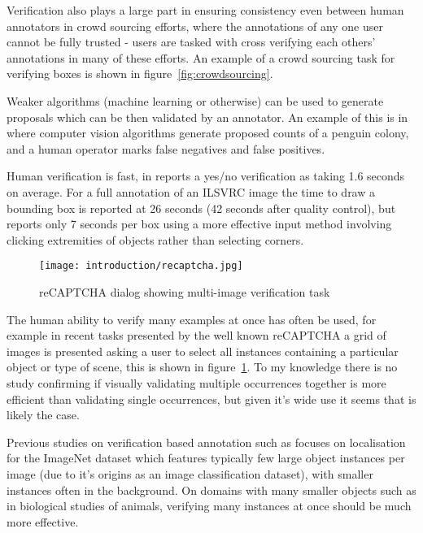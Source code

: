 Verification also plays a large part in ensuring consistency even between human annotators in crowd sourcing efforts, where the annotations of any one user cannot be fully trusted - users are tasked with cross verifying each others' annotations in many of these efforts. An example of a crowd sourcing task \cite{Su2012a} for verifying boxes is shown in figure~\ref{fig:crowdsourcing}.

Weaker algorithms (machine learning or otherwise) can be used to generate proposals which can be then validated by an annotator. An example of this is in \cite{McNeill2011} where computer vision algorithms generate proposed counts of a penguin colony, and a human operator marks false negatives and false positives.

Human verification is fast, in \cite{Papadopoulos2016} reports a yes/no verification as taking 1.6 seconds on average. For a full annotation of an \gls{ILSVRC} image \cite {Su2012a} the time to draw a bounding box is reported at 26 seconds (42 seconds after quality control), but \cite{Papadopoulos2017} reports only 7 seconds per box using a more effective input method involving clicking extremities of objects rather than selecting corners. 

\begin{figure}[h]
  \centering
  \texttt{[image: introduction/recaptcha.jpg]}
  \caption{reCAPTCHA dialog showing multi-image verification task}  
  \label{fig:captcha}
\end{figure}

The human ability to verify many examples at once has often be used, for example in recent tasks presented by the well known reCAPTCHA \cite{von2008recaptcha} a grid of images is presented asking a user to select all instances containing a particular object or type of scene, this is shown in figure~\ref{fig:captcha}. To my knowledge there is no study confirming if visually validating multiple occurrences together is more efficient than validating single occurrences, but given it's wide use it seems that is likely the case. 

Previous studies on verification based annotation such as \cite{Papadopoulos2016} focuses on localisation for the ImageNet dataset which features typically few large object instances per image (due to it's origins as an image classification dataset), with smaller instances often in the background. On domains with many smaller objects such as in biological studies of animals, verifying many instances at once should be much more effective. 


